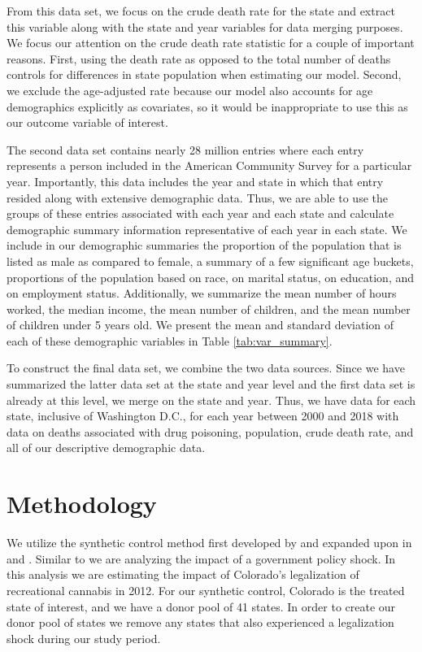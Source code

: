 \documentclass{article}
\begin{document}
From this data set, we focus on the crude death rate for the state and extract this variable along with the state and year variables for data merging purposes. We focus our attention on the crude death rate statistic for a couple of important reasons. First, using the death rate as opposed to the total number of deaths controls for differences in state population when estimating our model. Second, we exclude the age-adjusted rate because our model also accounts for age demographics explicitly as covariates, so it would be inappropriate to use this as our outcome variable of interest.

The second data set contains nearly 28 million entries where each entry represents a person included in the American Community Survey for a particular year.  Importantly, this data includes the year and state in which that entry resided along with extensive demographic data. Thus, we are able to use the groups of these entries associated with each year and each state and calculate demographic summary information representative of each year in each state. We include in our demographic summaries the proportion of the population that is listed as male as compared to female, a summary of a few significant age buckets, proportions of the population based on race, on marital status, on education, and on employment status. Additionally, we summarize the mean number of hours worked, the median income, the mean number of children, and the mean number of children under 5 years old. We present the mean and standard deviation of each of these demographic variables in Table \ref{tab:var_summary}.

To construct the final data set, we combine the two data sources. Since we have summarized the latter data set at the state and year level and the first data set is already at this level, we merge on the state and year. Thus, we have data for each state, inclusive of Washington D.C., for each year between 2000 and 2018 with data on deaths associated with drug poisoning, population, crude death rate, and all of our descriptive demographic data.



\section{Methodology}

We utilize the synthetic control method first developed by \citet{AbadieA2003TECo} and expanded upon in \citet{AbadieAlberto2010SCMf} and \citet{AbadieAlberto2015CPat}. Similar to \citet{AbadieAlberto2010SCMf} we are analyzing the impact of a government policy shock. In this analysis we are estimating the impact of Colorado's legalization of recreational cannabis in 2012. For our synthetic control, Colorado is the treated state of interest, and we have a donor pool of 41 states. In order to create our donor pool of states we remove any states that also experienced a legalization shock during our study period.
\end{document}
